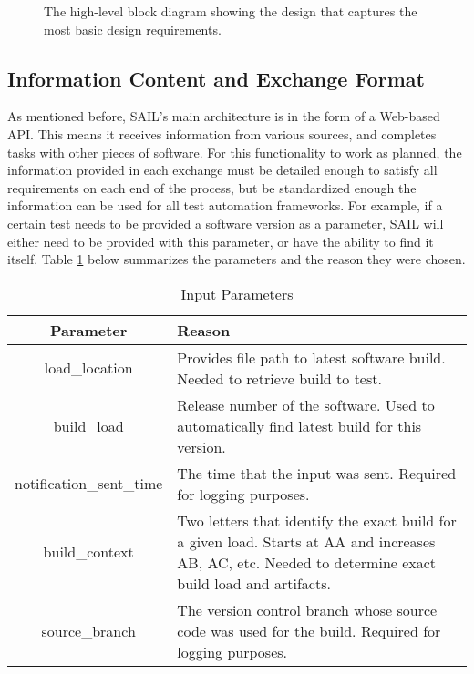 \documentclass[10pt, titlepage, onecolumn, openany]{article}
\begin{document}
\begin{figure}[H]
\centering
{}
\caption{The high-level block diagram showing the design that
captures
the most basic design requirements.}
\label{basicHLD}
\end{figure}

\subsection{Information Content and Exchange Format}
As mentioned before, SAIL's main architecture is in the form of
a Web-based API. This means it receives information from various
sources, and completes tasks with other pieces of software. For
this functionality to work as planned, the information provided
in each exchange must be detailed enough to satisfy all
requirements
on each end of the process, but be standardized enough the
information can be used for all test automation frameworks.
For example, if a certain test
needs to be provided a software version as a parameter, SAIL
will either need to be provided with this parameter, or have the
ability to find it itself. Table \ref{inputParams} below summarizes
the parameters and the reason they were chosen.

\begin{table}[h]
\caption{Input Parameters}
\centering
\begin{tabular}{|c|p{5cm}|}
    \hline
    \textbf{Parameter} & \textbf{Reason} \\
    \hline
    load\_location & Provides file path to latest software build. Needed to
    retrieve build to test. \\
    \hline
    build\_load & Release number of the software. Used to automatically find
    latest build for this version. \\
    \hline
    notification\_sent\_time & The time that the input was sent. Required for
    logging purposes. \\
    \hline
    build\_context & Two letters that identify the exact build for a given load.
    Starts at AA and increases AB, AC, etc. Needed to determine exact build load
    and artifacts. \\
    \hline
    source\_branch & The version control branch whose source code was used for
    the build. Required for logging purposes. \\
    \hline
\end{tabular}
\label{inputParams}
\end{table}
\end{document}
